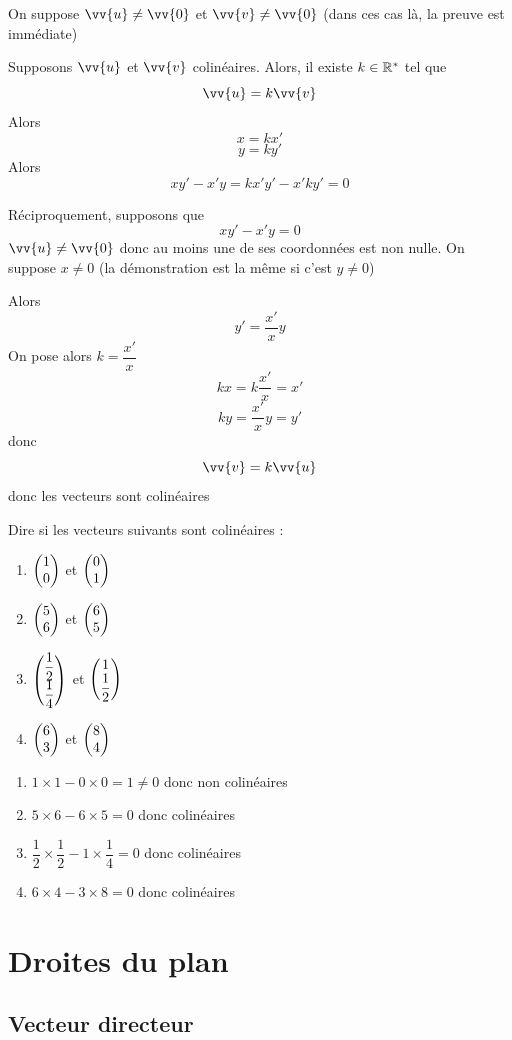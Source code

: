 \begin{preuve}
On suppose $\vv{u} \neq \vv{0}$ et $\vv{v} \neq \vv{0}$ (dans ces cas là, la preuve est immédiate)\newline

Supposons $\vv{u}$ et $\vv{v}$ colinéaires. Alors, il existe $k\in \mathbb{R}^*$ tel que $$\vv{u} = k\vv{v}$$
Alors 
$$x = kx'$$
$$y = ky'$$
Alors $$xy' - x'y = kx'y' - x'ky' = 0$$

Réciproquement, supposons que $$xy'-x'y = 0$$
$\vv{u} \neq \vv{0}$ donc au moins une de ses coordonnées est non nulle. On suppose $x \neq 0$ (la démonstration est la même si c'est $y\neq 0$)\newline

Alors $$y' = \dfrac{x'}{x}y$$
On pose alors $k = \dfrac{x'}{x}$ 
$$kx = k\dfrac{x'}{x} = x'$$
$$ky = \dfrac{x'}{x} y = y'$$
donc 
$$\vv{v} = k\vv{u}$$ 
donc les vecteurs sont colinéaires
\end{preuve}
\begin{exemples}
Dire si les vecteurs suivants sont colinéaires :
\begin{enumerate}
\item $\begin{pmatrix}1 \\0 \end{pmatrix}$ et $\begin{pmatrix}0 \\1 \end{pmatrix}$
\item $\begin{pmatrix}5 \\6 \end{pmatrix}$ et $\begin{pmatrix}6 \\5 \end{pmatrix}$
\item $\begin{pmatrix}\dfrac{1}{2} \\\dfrac{1}{4} \end{pmatrix}$ et $\begin{pmatrix}1 \\\dfrac{1}{2} \end{pmatrix}$
\item $\begin{pmatrix}6 \\3 \end{pmatrix}$ et $\begin{pmatrix}8 \\4 \end{pmatrix}$
\end{enumerate}
\begin{enumerate}
\item $1\times 1 -0\times 0 = 1\neq 0$ donc non colinéaires
\item $5\times 6 - 6\times 5 = 0$ donc colinéaires
\item $\dfrac{1}{2}\times \dfrac{1}{2} - 1\times \dfrac{1}{4} = 0$ donc colinéaires
\item $6\times 4 - 3\times 8 = 0$ donc colinéaires
\end{enumerate}
\end{exemples}
\section{Droites du plan}
\subsection{Vecteur directeur}
 \newline


